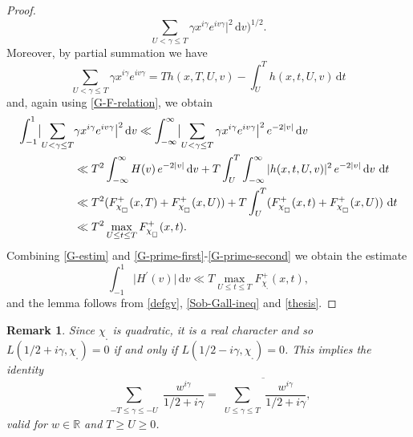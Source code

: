 \documentclass[pdflatex]{sn-jnl}%
\newcommand{\dx}{\mathrm{d}}
\theoremstyle{sltheorems}
\theoremstyle{plainrem}
\newtheorem{Rem}{Remark}
\theoremstyle{definition}
\begin{document}
\begin{proof}
\begin{equation}
\sum_{U <  \gamma \le  T} \!\!
\gamma x^{i\gamma}e^{iv\gamma}\bigr \vert ^2\, \dx v
\Bigr)^{1/2}.
\end{equation}
%
Moreover, by partial summation we have
\[
\sum_{U <  \gamma \le  T}\gamma x^{i\gamma}e^{iv\gamma}
=
T h(x, T, U, v)
- 
\int_{U}^T h(x, t, U, v)\, \dx t
\]
and, again using \eqref{G-F-relation}, we obtain
\begin{align}
\notag
\int_{-1}^{1}
\bigl \vert 
\sum_{U <  \gamma \le  T} & \gamma x^{i\gamma}e^{iv\gamma}\bigr \vert ^2 \, \dx v
\ll 
\int_{-\infty}^{\infty}
\bigl \vert 
\sum_{U <  \gamma \le  T}\gamma x^{i\gamma}e^{iv\gamma}\bigr \vert ^2\,e^{-2 \vert v \vert }\, \dx v
\\
\notag
&\ll 
T^2
\int_{-\infty}^{\infty} H(v)   \,e^{-2 \vert v \vert }\, \dx v
+ 
T  \int_{U}^T 
 \int_{-\infty}^{\infty} \vert h(x, t, U, v) \vert ^2  \,e^{-2 \vert v \vert }\, \dx v \,\, \dx t
\\
\notag
& 
\ll
T^2  (F^+_{\chi_{_\square}}(x,T) + F^+_{\chi_{_\square}}(x,U))
+
T  \int_{U}^T  (F^+_{\chi_{_\square}}(x,t) + F^+_{\chi_{_\square}}(x,U)) \,\, \dx t
 \\
\label{G-prime-second}  
&
\ll T^2  \max_{U\le t\le T}F^+_{\chi_{_\square}}(x,t).
\end{align}
Combining  \eqref{G-estim} and \eqref{G-prime-first}-\eqref{G-prime-second}
we obtain the estimate
%
\begin{equation}
\label{thesis}
\int_{-1}^1  \vert H^{\prime}(v) \vert \, \dx v  \ll T\max_{U\le t\le T}F^+_{\chi_{_\square}}(x,t),
\end{equation}
and the lemma  follows from \eqref{defgv}, \eqref{Sob-Gall-ineq} and \eqref{thesis}.
\end{proof}

\begin{Rem}\label{rem1}
Since $\chi_{_{\square}}$ is quadratic, it is a real character and so 
$L(1/2+i\gamma, \chi_{_{\square}})=0$ if and only if $L(1/2-i\gamma,\chi_{_{\square}})=0$.
This implies the identity
\[
 \sum_{\substack{-T \le  \gamma \le  -U
}} \frac{w^{i\gamma}}{1/2 + i\gamma} 
=
\overline{
   \sum_{\substack{U\le  \gamma \le  T }} 
\frac{w^{i\gamma}}{1/2 + i\gamma}},
\] 
valid for  $w\in \mathbb{R}$ and $T  \ge  U \ge0$.
\end{Rem}
\end{document}
